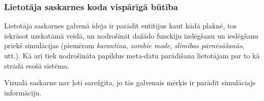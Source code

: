 \subsubsection*{Lietotāja saskarnes koda vispārīgā būtība}

Lietotāja saskarnes galvenā ideja ir parādīt entītijus kaut kādā plaknē, tos
iekrāsot uzskatāmā veidā, un nodrošināt dažādo funckiju izslēgšanu un ieslēgšanu
priekš simulācijas (piemēram \emph{karantīna}, \emph{zombie mode},
\emph{slimības pārnēsāšanās}, utt.). Kā arī tiek nodrošināta papildus meta-datu
parādīšana lietotājam par to kā strādā esošā sistēma.

Vizualā saskarne nav ļoti sarežģīta, jo tās galvenais mērķis ir parādīt simulāciajs
informāciju.
